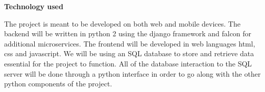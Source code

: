 \hspace{1in}

\Large{\bfseries{Technology used}}

\hspace{1in}

\normalsize

The project is meant to be developed on both web and mobile devices. The backend will be written in python 2 using the django framework and falcon for additional microservices. The frontend will be developed in web languages html, css and javascript. We will be using an SQL database to store and retrieve data essential for the project to function. All of the database interaction to the SQL server will be done through a python interface in order to go along with the other python components of the project.
